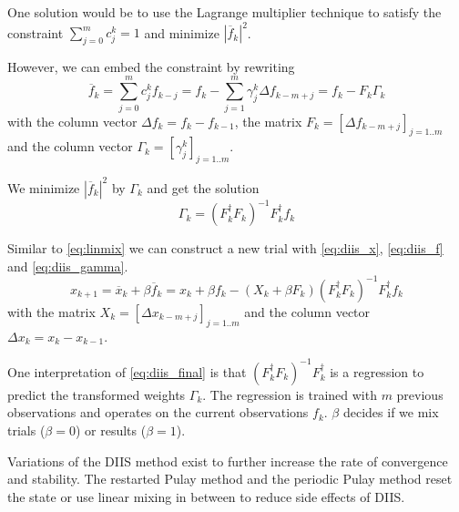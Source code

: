 One solution would be to use the Lagrange multiplier technique to satisfy the constraint \(\sum_{j=0}^{m} c_j^k = 1\) and minimize \(|\overline{f}_{k}|^2\).\cite{diis_math}

However, we can embed the constraint by rewriting \footnotemark
\begin{equation} \label{eq:diis_f}
\overline{f}_{k} = \sum_{j=0}^{m} c_j^k f_{k-j} = f_k - \sum_{j=1}^{m} \gamma_j^k {\Delta f}_{k-m+j} = f_k - F_k \Gamma_k
\end{equation}
with the column vector \({\Delta f}_{k} = f_k - f_{k-1}\), the matrix \(F_k = [{\Delta f}_{k-m+j}]_{j=1..m}\) and the column vector \(\Gamma_k = [\gamma_j^k]_{j=1..m}\).


We minimize \(|\overline{f}_{k}|^2\) by \(\Gamma_k\) and get the solution \footnotemark
\begin{equation} \label{eq:diis_gamma}
\Gamma_k = (F_k^\dagger F_k)^{-1} F_k^\dagger f_k
\end{equation}


Similar to \eqref{eq:linmix} we can construct a new trial with \eqref{eq:diis_x}, \eqref{eq:diis_f} and \eqref{eq:diis_gamma}.
\begin{equation} \label{eq:diis_final}
x_{k+1} = \overline{x}_k + \beta \overline{f}_k = x_k + \beta f_k - (X_k + \beta F_k) (F_k^\dagger F_k)^{-1} F_k^\dagger f_k
\end{equation}
with the matrix \(X_k = [{\Delta x}_{k-m+j}]_{j=1..m}\) and the column vector \({\Delta x}_{k} = x_k - x_{k-1}\).

One interpretation of \eqref{eq:diis_final} is that \((F_k^\dagger F_k)^{-1} F_k^\dagger\) is a regression to predict the transformed weights $\Gamma_k$. The regression is trained with \(m\) previous observations and operates on the current observations \(f_k\). $\beta$ decides if we mix trials (\(\beta = 0\)) or results (\(\beta = 1\)).

Variations of the DIIS method exist to further increase the rate of convergence and stability. The restarted Pulay method\cite{diis_restarted} and the periodic Pulay method\cite{diis_periodic} reset the state or use linear mixing in between to reduce side effects of DIIS.

